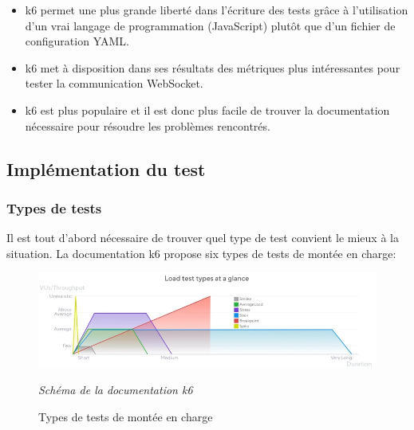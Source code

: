 \begin{itemize}
  \item k6 permet une plus grande liberté dans l'écriture des tests grâce à l'utilisation d'un vrai langage de programmation (JavaScript) plutôt que d'un fichier de configuration YAML.
  \item k6 met à disposition dans ses résultats des métriques plus intéressantes pour tester la communication WebSocket.
  \item k6 est plus populaire et il est donc plus facile de trouver la documentation nécessaire pour résoudre les problèmes rencontrés.
\end{itemize}

\subsection{Implémentation du test}

\subsubsection{Types de tests}

Il est tout d'abord nécessaire de trouver quel type de test convient le mieux à la situation. La documentation k6 propose six types de tests de montée en charge:

\begin{figure}[H]
  \centering
  \includegraphics[width=1\textwidth]{./assets/figures/load-test-types.png}
  \begin{center}
    \textit{Schéma de la documentation k6~\cite{k6-load-test-types}}
  \end{center}
  \caption{Types de tests de montée en charge}
  \label{fig:load-test-types}
\end{figure}

